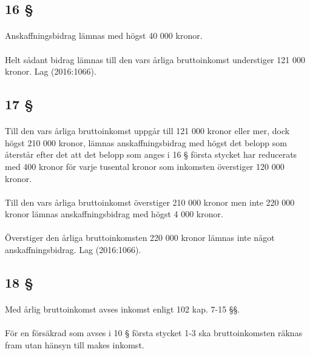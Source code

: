 \documentclass[a4paper,notitlepage,openany,10pt]{book}
\begin{document}
\subsection*{16 §}
\paragraph*{}
Anskaffningsbidrag lämnas med högst 40 000 kronor.
\paragraph*{}
Helt sådant bidrag lämnas till den vars årliga bruttoinkomst understiger 121 000 kronor.
Lag (2016:1066).
\subsection*{17 §}
\paragraph*{}
Till den vars årliga bruttoinkomst uppgår till 121 000 kronor eller mer, dock högst 210 000 kronor, lämnas anskaffningsbidrag med högst det belopp som återstår efter det att det belopp som anges i 16 § första stycket har reducerats med 400 kronor för varje tusental kronor som inkomsten överstiger 120 000 kronor.
\paragraph*{}
Till den vars årliga bruttoinkomst överstiger 210 000 kronor men inte 220 000 kronor lämnas anskaffningsbidrag med högst 4 000 kronor.
\paragraph*{}
Överstiger den årliga bruttoinkomsten 220 000 kronor lämnas inte något anskaffningsbidrag.
Lag (2016:1066).
\subsection*{18 §}
\paragraph*{}
Med årlig bruttoinkomst avses inkomst enligt 102 kap. 7-15 §§.
\paragraph*{}
För en försäkrad som avses i 10 § första stycket 1-3 ska bruttoinkomsten räknas fram utan hänsyn till makes inkomst.
\end{document}
